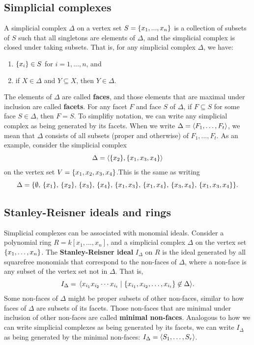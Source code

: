 \subsection{Simplicial complexes}
A simplicial complex $\Delta$ on a vertex set $S = \{ x_1, ..., x_n \} $ is a collection of subsets of $S$ such that all singletons are elements of $\Delta$, and the simplicial complex is closed under taking subsets. That is, for any simplicial complex $\Delta$, we have:
\begin{enumerate}
	\item $\{ x_i \} \in S$ for $i = 1, \dots, n$, and 
	\item if $X \in \Delta$ and $Y \subseteq X$, then $Y \in \Delta$. 
\end{enumerate} 
The elements of $\Delta$ are called \textbf{faces}, and those elements that are maximal under inclusion are called \textbf{facets}. For any facet $F$ and face $S$ of $\Delta$, if $F \subseteq S$ for some face $S \in \Delta$, then $F = S$. To simplifiy notation, we can write any simplicial complex as being generated by its facets. When we write $\Delta = \langle  F_1, \dots, F_t  \rangle$, we mean that $\Delta$ consists of all subsets (proper and otherwise) of $F_1, \dots, F_t$. As an example, consider the simplicial complex 
$$
\Delta = \langle  \{ x_2 \}, \{ x_1, x_3, x_4 \}  \rangle
$$
on the vertex set $V = \{ x_1, x_2, x_3, x_4 \}$.This is the same as writing 
$$
\Delta = \{  \emptyset, \, \{ x_1 \}, \, \{ x_2 \}, \, \{ x_3 \},\,  \{ x_4 \}, \, \{ x_1, x_3 \}, \, \{ x_1, x_4 \},\, \{ x_3, x_4 \}, \, \{ x_1, x_3, x_4 \} \}.
$$

\subsection{Stanley-Reisner ideals and rings}

Simplicial complexes can be associated with monomial ideals. Consider a polynomial ring $R = k[x_1, \dots, x_n]$, and a simplicial complex $\Delta$ on the vertex set $\{ x_1, \dots, x_n \}$. The \textbf{Stanley-Reisner ideal} $I_\Delta$ on $R$ is the ideal generated by all squarefree monomials that correspond to the non-faces of $\Delta$, where a non-face is any subset of the vertex set not in $\Delta$. That is, 
$$
I_\Delta = \, \langle x_{i_1} x_{i_2} \cdots x_{i_t} \; | \; \{ x_{i_1}, x_{i_2}, \dots, x_{i_t} \} \not \in \Delta  \rangle.
$$
Some non-faces of $\Delta$ might be proper subsets of other non-faces, similar to how faces of $\Delta$ are subsets of its facets. Those non-faces that are minimal under inclusion of other non-faces are called \textbf{minimal non-faces}. Analogous to how we can write simplicial complexes as being generated by its facets, we can write $I_\Delta$ as being generated by the minimal non-faces: $I_\Delta = \langle S_1, \dots, S_r \rangle$.

